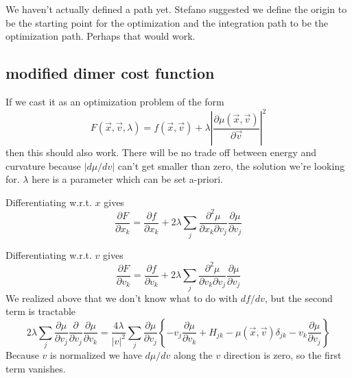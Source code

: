 \documentclass[a4paper]{article}
\begin{document}
We haven't actually defined a path yet.
Stefano suggested we define the origin to be the starting point for the
optimization and the integration path to be the optimization path.  Perhaps that would work.


\subsection{modified dimer cost function}

If we cast it as an optimization problem of the form
\begin{equation}
F(\vec{x}, \vec{v}, \lambda) = f(\vec{x}, \vec{v}) + \lambda \left| \frac{\partial \mu(\vec{x}, \vec{v})}{\partial \vec{v}} \right|^2
\end{equation}
then this should also work.  There will be no trade off between energy and curvature because $|d\mu / dv|$ 
can't get smaller than zero, the solution we're looking for.  $\lambda$ here is a parameter which can be set a-priori.  

Differentiating w.r.t. $x$ gives
\begin{equation}
\frac{\partial F}{\partial x_k} = \frac{\partial f}{\partial x_k} +
2 \lambda \sum_j 
\frac{\partial^2 \mu}{\partial x_k \partial v_j} \frac{\partial
\mu}{\partial v_j}
\end{equation}


Differentiating w.r.t. $v$ gives
\begin{equation}
\frac{\partial F}{\partial v_k} = \frac{\partial f}{\partial v_k} +
2 \lambda \sum_j 
\frac{\partial^2 \mu}{\partial v_k \partial v_j} \frac{\partial
\mu}{\partial v_j}
\end{equation}
We realized above that we don't know what to do with $df/dv$, but the second term is tractable
\begin{equation}
2 \lambda \sum_j \frac{\partial \mu}{\partial v_j} \frac{\partial }{\partial v_j }
\frac{\partial \mu}{\partial v_k}
= 
\frac{4 \lambda}{|v|^2}
\sum_j 
\frac{\partial \mu}{\partial v_j} 
\left\{
-v_j \frac{\partial \mu}{\partial v_k}
+
H_{jk}
-
\mu(\vec{x}, \vec{v}) \delta_{jk}
-
v_k \frac{\partial \mu}{\partial v_j}
\right\}
\end{equation}
Because $v$ is normalized we have $d\mu /dv$ along the $v$ direction is zero, so the first term vanishes.
\end{document}
